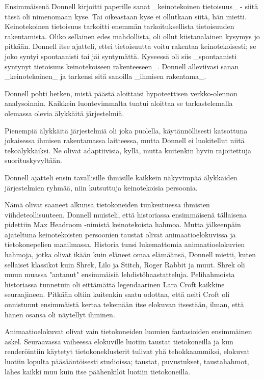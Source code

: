 Ensimmäisenä Donnell kirjoitti paperille sanat _keinotekoinen tietoisuus_ - siitä tässä oli nimenomaan kyse. Tai oikeastaan kyse ei ollutkaan siitä, hän mietti. Keinotekoinen tietoisuus tarkoitti enemmän tarkoituksellista tietoisuuden rakentamista. Oliko sellainen edes mahdollista, oli ollut kiistanalainen kysymys jo pitkään. Donnell itse ajatteli, ettei tietoisuutta voitu rakentaa keinotekoisesti; se joko syntyi spontaanisti tai jäi syntymättä. Kyseessä oli siis _spontaanisti syntynyt tietoisuus keinotekoiseen rakenteeseen_. Donnell alleviivasi sanan _keinotekoinen_ ja tarkensi sitä sanoilla _ihmisen rakentama_.


Donnell pohti hetken, mistä päästä aloittaisi hypoteettisen verkko-olennon analysoinnin. Kaikkein luontevimmalta tuntui aloittaa se tarkastelemalla olemassa olevia älykkäitä järjestelmiä.


Pienempiä älykkäitä järjestelmiä oli joka puolella, käytännöllisesti katsottuna jokaisessa ihmisen rakentamassa laitteessa, mutta Donnell ei luokitellut niitä tekoälykkäiksi. Ne olivat adaptiivisia, kyllä, mutta kuitenkin hyvin rajoitettuja suorituskyvyltään.


Donnell ajatteli ensin tavallisille ihmisille kaikkein näkyvimpää älykkäiden järjestelmien ryhmää, niin kutsuttuja keinotekoisia persoonia.


Nämä olivat saaneet alkunsa tietokoneiden tunkeutuessa ihmisten viihdeteollisuuteen. Donnell muisteli, että historiassa ensimmäisenä tällaisena pidettiin Max Headroom -nimistä keinotekoista hahmoa. Mutta jälkeenpäin ajateltuna keinotekoisten persoonien taustat olivat animaatioelokuvissa ja tietokonepelien maailmassa. Historia tunsi lukemattomia animaatioelokuvien hahmoja, jotka olivat ikään kuin eläneet omaa elämäänsä, Donnell mietti, kuten sellaiset klassikot kuin Shrek, Lilo ja Stitch, Roger Rabbit ja muut. Shrek oli muun muassa "antanut" ensimmäisiä lehdistöhaastatteluja. Pelihahmoista historiassa tunnetuin oli eittämättä legendaarinen Lara Croft kaikkine seuraajineen. Pitkään oltiin kuitenkin saatu odottaa, että neiti Croft oli onnistunut ensimmäistä kertaa tekemään itse elokuvan itsestään, ilman, että hänen osansa oli näytellyt ihminen.


Animaatioelokuvat olivat vain tietokoneiden luomien fantasioiden ensimmäinen askel. Seuraavassa vaiheessa elokuville luotiin taustat tietokoneilla ja kun renderöintiin käytetyt tietokoneklusterit tulivat yhä tehokkaammiksi, elokuvat luotiin lopulta pääsääntöisesti studioissa; taustat, puvustukset, taustahahmot, lähes kaikki muu kuin itse päähenkilöt luotiin tietokoneilla.


